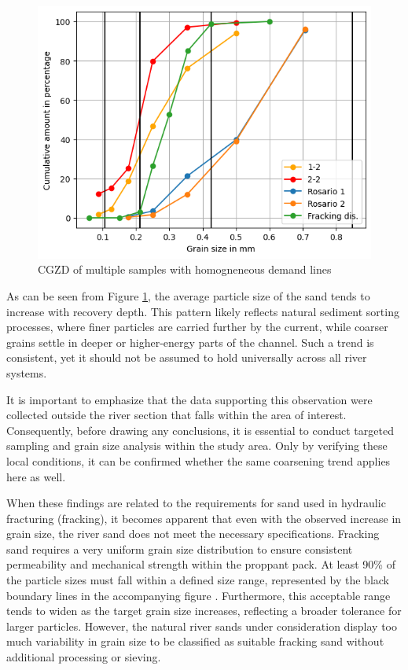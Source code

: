 \begin{figure}[H]
    \centering
    \includegraphics[width=0.75\linewidth]{figures//ch6/comparison2.png}
    \caption{CGZD of multiple samples with homogneneous demand lines \autocite{bensonFracSandUnited2015}}
    \label{fig:rd}
\end{figure}

As can be seen from Figure \ref{fig:rd}, the average particle size of the sand tends to increase with recovery depth. This pattern likely reflects natural sediment sorting processes, where finer particles are carried further by the current, while coarser grains settle in deeper or higher-energy parts of the channel. Such a trend is consistent, yet it should not be assumed to hold universally across all river systems.

It is important to emphasize that the data supporting this observation were collected outside the river section that falls within the area of interest. Consequently, before drawing any conclusions, it is essential to conduct targeted sampling and grain size analysis within the study area. Only by verifying these local conditions, it can be confirmed whether the same coarsening trend applies here as well.

When these findings are related to the requirements for sand used in hydraulic fracturing (fracking), it becomes apparent that even with the observed increase in grain size, the river sand does not meet the necessary specifications. Fracking sand requires a very uniform grain size distribution to ensure consistent permeability and mechanical strength within the proppant pack. At least 90\% of the particle sizes must fall within a defined size range, represented by the black boundary lines in the accompanying figure \autocite{bensonFracSandUnited2015}.
Furthermore, this acceptable range tends to widen as the target grain size increases, reflecting a broader tolerance for larger particles. However, the natural river sands under consideration display too much variability in grain size to be classified as suitable fracking sand without additional processing or sieving.



